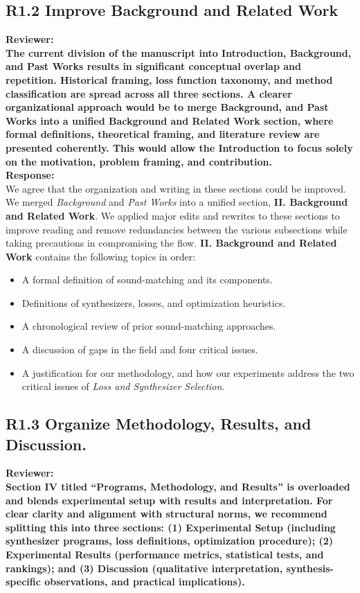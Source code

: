 \documentclass[11pt]{article}
\begin{document}
\subsection{R1.2 Improve Background and Related Work}
\label{R1.2}
\noindent\textbf{Reviewer:}\\
\noindent\textbf{The current division of the manuscript into Introduction, Background, and Past Works results in significant conceptual overlap and repetition. Historical framing, loss function taxonomy, and method classification are spread across all three sections. A clearer organizational approach would be to merge Background, and Past Works into a unified Background and Related Work section, where formal definitions, theoretical framing, and literature review are presented coherently. This would allow the Introduction to focus solely on the motivation, problem framing, and contribution.}\\

\noindent\textbf{Response:} \\
We agree that the organization and writing in these sections could be improved. We merged \emph{Background} and \emph{Past Works} into a unified section, \textbf{II. Background and Related Work}. We applied major edits and rewrites to these sections to improve reading and remove redundancies between the various subsections while taking precautions in compromising the flow.
\textbf{II. Background and Related Work} contains the following topics in order:  
\begin{itemize}
  \item A formal definition of sound-matching and its components.
  \item Definitions of synthesizers, losses, and optimization heuristics. 
  \item A chronological review of prior sound-matching approaches.
  \item A discussion of gaps in the field and four critical issues.
  \item A justification for our methodology, and how our experiments address the two critical issues of \emph{Loss and Synthesizer Selection}.
\end{itemize}


\subsection*{R1.3 Organize Methodology, Results, and Discussion.}
\label{R1.3}
\noindent\textbf{Reviewer:}\\
\textbf{Section IV titled ``Programs, Methodology, and Results'' is overloaded and blends experimental setup with results and interpretation. For clear clarity and alignment with structural norms, we recommend splitting this into three sections: (1) Experimental Setup (including synthesizer programs, loss definitions, optimization procedure); (2) Experimental Results (performance metrics, statistical tests, and rankings); and (3) Discussion (qualitative interpretation, synthesis-specific observations, and practical implications).}
\\
\end{document}
